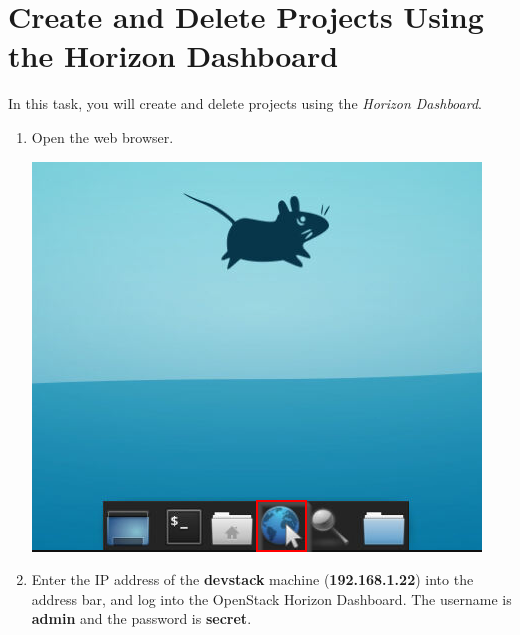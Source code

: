 \documentclass[letterpaper, 12pt]{article}
\begin{document}
\section{Create and Delete Projects Using the Horizon Dashboard}
\label{sec:create_and_delete_projects_using_the_horizon_dashboard}
In this task, you will create and delete projects using the \textit{Horizon Dashboard}.

\begin{enumerate}
    \item Open the web browser.

    \begin{center}
    \includegraphics[scale=0.75]{images/part1/step1.png}
    \end{center}

    \item Enter the IP address of the \textbf{devstack} machine (\textbf{192.168.1.22}) into the address bar, and log
    into the OpenStack Horizon Dashboard. The username is \textbf{admin} and the password is \textbf{secret}.
    

\end{enumerate}
\end{document}
